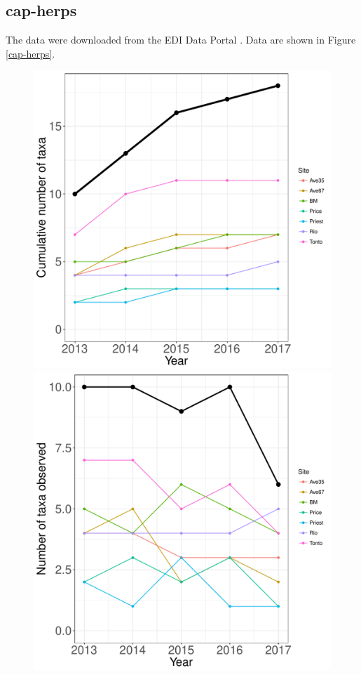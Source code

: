\documentclass[11pt, oneside]{article}
\begin{document}
\subsection {cap-herps}
The data were downloaded from the EDI Data Portal \citep{cap-herps}.
Data are shown in Figure \ref{cap-herps}.

\begin{figure}[h!]
\centering
\includegraphics[scale = 0.4]{cap-herps-banville_species_accumulation_curve.pdf}
\includegraphics[scale = 0.4]{cap-herps-banville_num_taxa_over_time.pdf}

\end{figure}
\end{document}
